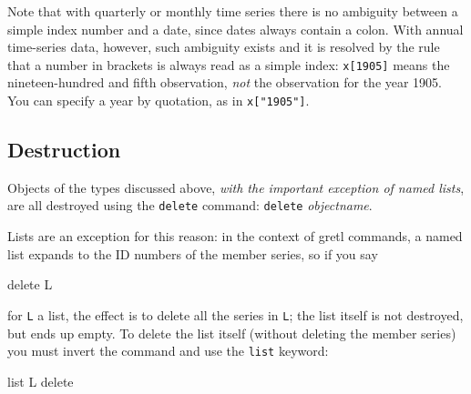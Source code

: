 Note that with quarterly or monthly time series there is no ambiguity
between a simple index number and a date, since dates always contain a
colon. With annual time-series data, however, such ambiguity exists
and it is resolved by the rule that a number in brackets is always
read as a simple index: \texttt{x[1905]} means the nineteen-hundred
and fifth observation, \textit{not} the observation for the year 1905.
You can specify a year by quotation, as in \verb|x["1905"]|.

\subsection{Destruction}

Objects of the types discussed above, \textit{with the important
  exception of named lists}, are all destroyed using the
\texttt{delete} command: \texttt{delete} \textsl{objectname}.

Lists are an exception for this reason: in the context of gretl
commands, a named list expands to the ID numbers of the member series,
so if you say

\begin{code}
delete L
\end{code} 

for \texttt{L} a list, the effect is to delete all the series in
\texttt{L}; the list itself is not destroyed, but ends up empty.  To
delete the list itself (without deleting the member series) you must
invert the command and use the \texttt{list} keyword:

\begin{code}
list L delete
\end{code} 
